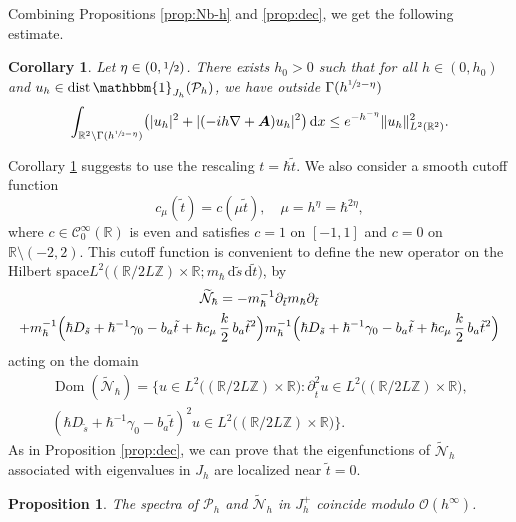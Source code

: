 \documentclass[JEP,XML,SOM,Unicode,NoFloatCountersInSection,published]{cedram}
\let\sep:
\newcommand{\rd}{\,\mathrm{d}}
\DeclareMathOperator{\dist}{dist}
\DeclareMathOperator{\Dom}{Dom}
\newcommand{\cP}{\mathcal{P}}
\let\mathds\mathbbm
\theoremstyle{plain}
\newtheorem{corollary}[theorem]{Corollary}
\newtheorem{proposition}[theorem]{Proposition}
\theoremstyle{definition}
\newcommand{\A}{\boldsymbol{A}}
\newcommand{\R}{\mathbb{R}}
\newcommand{\Z}{\mathbb{Z}}
\begin{document}
Combining Propositions \ref{prop:Nb-h} and \ref{prop:dec}, we get the following estimate.
\begin{corollary}\label{cor.expdecay}
Let $\eta\in\left(0,\sfrac12\right)$. There exists $h_0>0$ such that for all $h\in(0,h_0)$ and $u_h\in \dist\mathds{1}_{J_h}(\cP_h)$, we have outside $\Gamma(h^{\sfrac12-\eta})$
\begin{equation}\label{eq:dec-norm'}
\int_{\mathbb{R}^2\setminus\Gamma(h^{\sfrac12-\eta})}\bigl(|u_{h}|^2+|(-ih\nabla+\A)u_{h}|^2 \bigr)\rd x\leq e^{-h^{-\eta}}\|u_h\|^2_{L^2(\R^2)}.
\end{equation}
\end{corollary}

Corollary \ref{cor.expdecay} suggests to use the rescaling $t=\hbar \tilde t$. We also consider a smooth cutoff function
\begin{equation}\label{eq:c-delta}
c_\mu(\tilde t)= c(\mu\tilde t),\quad \mu=h^{\eta}=\hbar^{2\eta},
\end{equation}
where $c\in \mathscr{C}^\infty_0(\mathbb R)$ is even and satisfies $c=1$ on $[-1,1]$ and $c=0$ on $\mathbb R\setminus(-2,2)$. This cutoff function is convenient to define the new operator on the Hilbert space\break$ L^2\bigl((\mathbb R/ 2L \mathbb Z)\times\mathbb R;m_\hbar \rd \tilde s \rd \tilde t\bigr)$, by
\begin{multline*}
\widetilde{\mathcal N}_{\hbar}=-m^{-1}_{\hbar}\partial_{\tilde t} m_{\hbar}\partial_{\tilde t}\\
+m^{-1}_{\hbar}\Bigl(\hbar D_{\tilde s}+\hbar^{-1}\gamma_0-b_a\tilde t +\hbar c_\mu \,\frac{k}{2}\,b_a\tilde t^2\Bigr) m^{-1}_{\hbar}\Bigl(\hbar D_{\tilde s}+\hbar^{-1}\gamma_0-b_a\tilde t+\hbar c_\mu\,\frac{k}{2}\,b_a\tilde t^2\Bigr)
\end{multline*}
acting on the domain
\begin{multline*}
\Dom(\widetilde{\mathcal N}_{\hbar})=\bigl\{ u\in L^2\bigl((\mathbb R/ 2L \mathbb Z)\times\mathbb R\bigr)\sep \partial_{\tilde t}^2u\in L^2\bigl((\R/2L\Z)\times\mathbb R\bigr), \\
(\hbar D_{\tilde s}+\hbar^{-1}\gamma_0-b_a\tilde t)^2 u \in L^2\bigl((\mathbb R/ 2L \mathbb Z)\times\mathbb R\bigr) \bigr\}.
\end{multline*}
As in Proposition \ref{prop:dec}, we can prove that the eigenfunctions of $\widetilde{\mathcal{N}}_h$ associated with eigenvalues in $J_h$ are localized near $\tilde t=0$.

\begin{proposition}
\label{prop:BHR2.7}
The spectra of $\cP_h$ and $\widetilde{\mathcal{N}}_h$ in $J^+_h$ coincide modulo $\mathcal{O}(h^{\infty})$.
\end{proposition}
\end{document}
